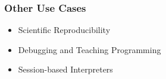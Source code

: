 \begin{frame}[fragile]
  \frametitle{Other Use Cases}
  \begin{itemize}
    \item Scientific Reproducibility
    \pause
    \item Debugging and Teaching Programming
    \pause
    \item Session-based Interpreters
  \end{itemize}
\end{frame}